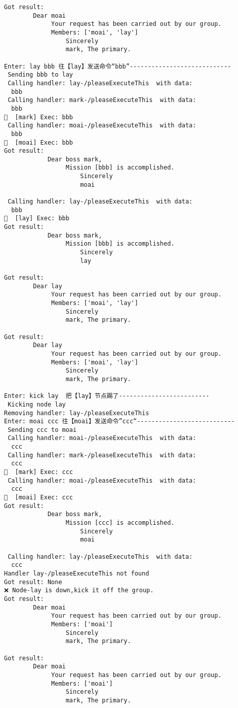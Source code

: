 \begin{tcolorbox}[breakable]
\begin{verbatim}
Got result: 
        Dear moai
             Your request has been carried out by our group.
             Members: ['moai', 'lay']
                 Sincerely
                 mark, The primary.
         
Enter: lay bbb 往【lay】发送命令“bbb”----------------------------
 Sending bbb to lay 
 Calling handler: lay-/pleaseExecuteThis  with data:
  bbb 
 Calling handler: mark-/pleaseExecuteThis  with data:
  bbb 
🦜  [mark] Exec: bbb 
 Calling handler: moai-/pleaseExecuteThis  with data:
  bbb 
🦜  [moai] Exec: bbb 
Got result: 
            Dear boss mark,
                 Mission [bbb] is accomplished.
                     Sincerely
                     moai
             
 Calling handler: lay-/pleaseExecuteThis  with data:
  bbb 
🦜  [lay] Exec: bbb 
Got result: 
            Dear boss mark,
                 Mission [bbb] is accomplished.
                     Sincerely
                     lay
             
Got result: 
        Dear lay
             Your request has been carried out by our group.
             Members: ['moai', 'lay']
                 Sincerely
                 mark, The primary.
         
Got result: 
        Dear lay
             Your request has been carried out by our group.
             Members: ['moai', 'lay']
                 Sincerely
                 mark, The primary.
         
Enter: kick lay  把【lay】节点踢了-------------------------
 Kicking node lay 
Removing handler: lay-/pleaseExecuteThis
Enter: moai ccc 往【moai】发送命令”ccc“--------------------------- 
 Sending ccc to moai 
 Calling handler: moai-/pleaseExecuteThis  with data:
  ccc 
 Calling handler: mark-/pleaseExecuteThis  with data:
  ccc 
🦜  [mark] Exec: ccc 
 Calling handler: moai-/pleaseExecuteThis  with data:
  ccc 
🦜  [moai] Exec: ccc 
Got result: 
            Dear boss mark,
                 Mission [ccc] is accomplished.
                     Sincerely
                     moai
             
 Calling handler: lay-/pleaseExecuteThis  with data:
  ccc 
Handler lay-/pleaseExecuteThis not found
Got result: None 
❌️ Node-lay is down,kick it off the group.
Got result: 
        Dear moai
             Your request has been carried out by our group.
             Members: ['moai']
                 Sincerely
                 mark, The primary.
         
Got result: 
        Dear moai
             Your request has been carried out by our group.
             Members: ['moai']
                 Sincerely
                 mark, The primary.
         

\end{verbatim}
\end{tcolorbox}
